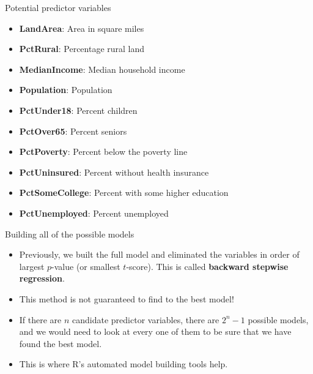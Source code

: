 \documentclass{beamer}\usepackage[]{graphicx}\usepackage[]{color}
\makeatletter
\newcommand{\hlnum}[1]{\textcolor[rgb]{0.824,0.412,0.118}{#1}}%
\newcommand{\hlcom}[1]{\textcolor[rgb]{0.824,0.706,0.549}{#1}}%
\newcommand{\hlopt}[1]{\textcolor[rgb]{1,0.894,0.769}{#1}}%
\newcommand{\hlstd}[1]{\textcolor[rgb]{1,0.894,0.769}{#1}}%
\newcommand{\hlkwd}[1]{\textcolor[rgb]{1,0.78,0.769}{#1}}%
\newenvironment{kframe}{%
 \def\at@end@of@kframe{}%
 \ifinner\ifhmode%
  \def\at@end@of@kframe{\end{minipage}}%
  \begin{minipage}{\columnwidth}%
 \fi\fi%
 \def\FrameCommand##1{\hskip\@totalleftmargin \hskip-\fboxsep
 \colorbox{shadecolor}{##1}\hskip-\fboxsep
     \hskip-\linewidth \hskip-\@totalleftmargin \hskip\columnwidth}%
 \MakeFramed {\advance\hsize-\width
   \@totalleftmargin\z@ \linewidth\hsize
   \@setminipage}}%
 {\par\unskip\endMakeFramed%
 \at@end@of@kframe}
\newenvironment{knitrout}{}{} %
\makeatother
\begin{document}
\begin{darkframes}

    \begin{frame}[fragile]{Potential predictor variables}
      \begin{itemize}
        \item \textbf{LandArea}:       Area in square miles
        \item \textbf{PctRural}:       Percentage rural land
        \item \textbf{MedianIncome}:   Median household income
        \item \textbf{Population}:     Population
        \item \textbf{PctUnder18}:     Percent children
        \item \textbf{PctOver65}:      Percent seniors
        \item \textbf{PctPoverty}:     Percent below the poverty line
        \item \textbf{PctUninsured}:   Percent without health insurance
        \item \textbf{PctSomeCollege}: Percent with some higher education
        \item \textbf{PctUnemployed}:  Percent unemployed
      \end{itemize}
    \end{frame}

    \begin{frame}{Building all of the possible models}
      \begin{itemize}[<+->]
        \item Previously, we built the full model and eliminated the variables in order of largest 
        $p$-value (or smallest $t$-score). This is called \textbf{backward stepwise regression}.
        \item This method is not guaranteed to find to the best model!
        \item If there are $n$ candidate predictor variables, there are $2^n-1$ possible models, and we would need to look at every one of them to be sure that we have found the best model.
        \item This is where R's automated model building tools help.
      \end{itemize} 
      \lc  %
    \end{frame}


\end{darkframes}
\end{document}
